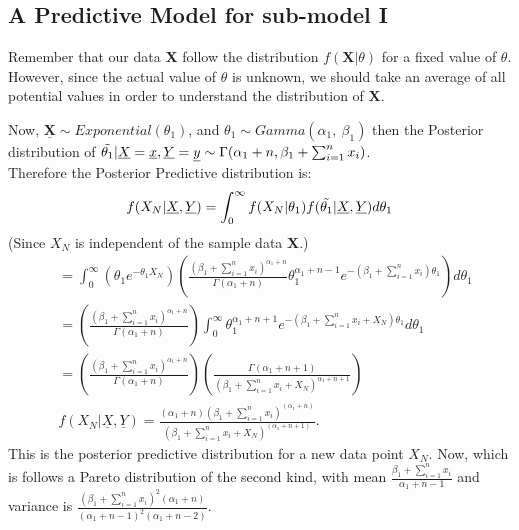 \documentclass[12pt]{article}    %
\numberwithin{equation}{section}
\begin{document}
\subsection*{A Predictive Model for sub-model I} Remember that our data \textbf{X} follow the distribution $f(\textbf{X}|\theta)$ for a fixed value of $\theta$. However, since the actual value of $\theta$ is unknown, we should take an average of all potential values in order to understand the distribution of $\textbf{X}$.
\par Now, $\underline{\boldsymbol{X}} \sim Exponential(\theta_1)$, and $\theta_1 \sim Gamma(\alpha_1, ~\beta_1)$ then the Posterior distribution of $\Tilde{\theta_1}|\underline{X}=\underline{x},\underline{Y}=\underline{y} \sim \Gamma(\alpha_1+n,  \beta_1+\sum^n_{i=1}x_i)$. \\
Therefore the Posterior Predictive distribution is:\\
\begin{equation*}
f(X_N|\underline{X},\underline{Y}) = \int_0^{\infty}f(X_N|\theta_1)f(\Tilde{\theta_1}|\underline{X},\underline{Y})d\theta_1
\end{equation*}
(Since $X_N$ is independent of the sample data $\boldsymbol{X}$.)
\begin{equation*}
\begin{split}
&= \int_0^{\infty}\left(\theta_1 e^{-\theta_1X_N}\right)\left(\frac{(\beta_1+\sum^n_{i=1}x_i)^{\alpha_1+n}}{\Gamma(\alpha_1+n)
}\theta_1^{\alpha_1+n-1}e^{-(\beta_1+\sum^n_{i=1}x_i)\theta_1}\right)d\theta_1 \\
&= \left(\frac{(\beta_1+\sum^n_{i=1}x_i)^{\alpha_1+n}}{\Gamma(\alpha_1+n)}\right)\int_0^{\infty}\theta_1^{\alpha_1+n+1}e^{-(\beta_1+\sum^n_{i=1}x_i+X_N)\theta_1}d\theta_1\\
&= \left(\frac{(\beta_1+\sum^n_{i=1}x_i)^{\alpha_1+n}}{\Gamma(\alpha_1+n)}\right)\left(\frac{\Gamma(\alpha_1+n+1)}{(\beta_1+\sum^n_{i=1}x_i+X_N)^{\alpha_1+n+1}}\right)\\
& f(X_N|\underline{X},\underline{Y}) = \frac{(\alpha_1+n)(\beta_1+\sum^n_{i=1}x_i)^{(\alpha_1+n)}}{(\beta_1+\sum^n_{i=1}x_i+X_N)^{(\alpha_1+n+1)}}.
\end{split}
\end{equation*}
This is the posterior predictive distribution for a new data point $X_N$. Now, which is follows a Pareto distribution of the second kind, with mean $\frac{\beta_1+\sum^n_{i=1}x_i}{\alpha_1+n-1}$ and variance is $\frac{(\beta_1+\sum^n_{i=1}x_i)^2(\alpha_1+n)}{(\alpha_1+n-1)^2(\alpha_1+n-2)}$. \\
\end{document}
